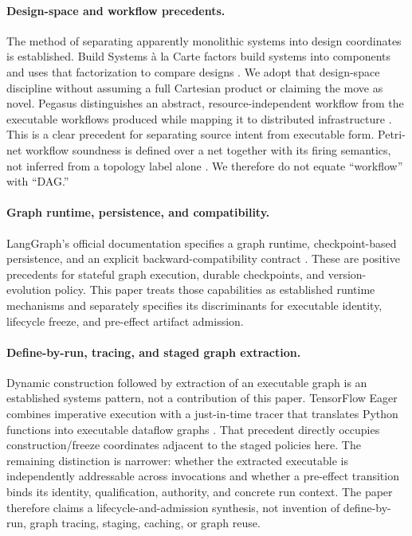 \documentclass[11pt]{article}
\begin{document}
\paragraph{Design-space and workflow precedents.}
The method of separating apparently monolithic systems into design coordinates
is established.  Build Systems \`a la Carte factors build systems into
components and uses that factorization to compare designs
\cite{Mokhov2018BuildSystems}.  We adopt that design-space discipline without
assuming a full Cartesian product or claiming the move as novel.
Pegasus distinguishes an abstract, resource-independent workflow from the
executable workflows produced while mapping it to distributed infrastructure
\cite{Deelman2015Pegasus}.  This is a clear precedent for separating source
intent from executable form.  Petri-net workflow soundness is defined over a
net together with its firing semantics, not inferred from a topology label
alone \cite{VanDerAalst1998Workflow}.  We therefore do not equate
``workflow'' with ``DAG.''

\paragraph{Graph runtime, persistence, and compatibility.}
LangGraph's official documentation specifies a graph runtime, checkpoint-based
persistence, and an explicit backward-compatibility contract
\cite{LangChain2026LangGraphRuntime,LangChain2026LangGraphPersistence,LangChain2026LangGraphCompatibility}.
These are positive precedents for stateful graph execution, durable
checkpoints, and version-evolution policy. This paper treats those capabilities
as established runtime mechanisms and separately specifies its discriminants
for executable identity, lifecycle freeze, and pre-effect artifact admission.

\paragraph{Define-by-run, tracing, and staged graph extraction.}
Dynamic construction followed by extraction of an executable graph is an
established systems pattern, not a contribution of this paper. TensorFlow Eager
combines imperative execution with a just-in-time tracer that translates Python
functions into executable dataflow graphs \cite{Agrawal2019TensorFlowEager}.
That precedent directly occupies construction/freeze coordinates adjacent to
the staged policies here. The remaining distinction is narrower: whether the
extracted executable is independently addressable across invocations and
whether a pre-effect transition binds its identity, qualification, authority,
and concrete run context. The paper therefore claims a lifecycle-and-admission
synthesis, not invention of define-by-run, graph tracing, staging, caching, or
graph reuse.
\end{document}
